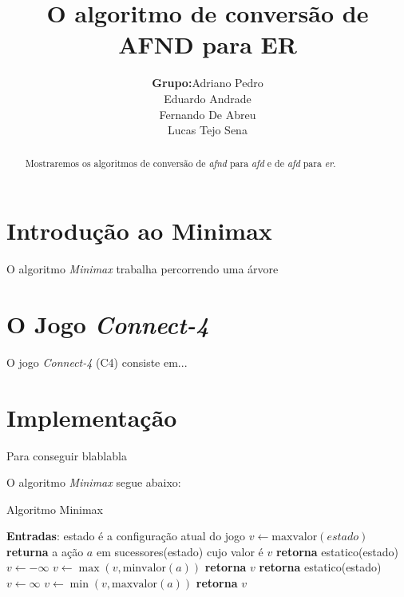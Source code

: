 \documentclass[a4paper,10pt]{article} %
\title{O algoritmo de conversão de AFND para ER}
\author{
    \begin{tabular}{ll}
        \textbf{Grupo:} &
        Adriano Pedro \tabularnewline &
        Eduardo Andrade\tabularnewline &
        Fernando De Abreu\tabularnewline &
        Lucas Tejo Sena\tabularnewline
    \end{tabular}
}
\begin{document}
\maketitle

\begin{abstract}

    Mostraremos os algoritmos de conversão de \textit{afnd} para \textit{afd} e de \textit{afd} para \textit{er}.

\end{abstract}


\section{Introdução ao Minimax}

O algoritmo \textit{Minimax} trabalha percorrendo uma árvore

\section{O Jogo \textit{Connect-4}}

O jogo \textit{Connect-4} (C4) consiste em...

\section{Implementação}

Para conseguir blablabla

O algoritmo \textit{Minimax} segue abaixo:

\begin{algorithm}
\caption{Algoritmo Minimax}\label{alg:minimax}
\begin{algorithmic}[1]
\State \textbf{Entradas}: estado é a configuração atual do jogo
\State $v\gets \mathrm{maxvalor}{(estado)}$
\State \textbf{returna} a ação $a$ em sucessores(estado) cujo valor é $v$ %
\EndFunction
{}
   \State \textbf{retorna} estatico(estado)
\EndIf
\State $v \gets -\infty$
    \State $v \gets \max{(v, \mathrm{minvalor}(a))}$
\EndFor
\State \textbf{retorna} $v$
\EndFunction
{}
   \State \textbf{retorna} estatico(estado)
\EndIf
\State $v \gets \infty$
    \State $v \gets \min{(v, \mathrm{maxvalor}(a))}$
\EndFor
\State \textbf{retorna} $v$
\EndFunction
\end{algorithmic}
\end{algorithm}
\end{document}
